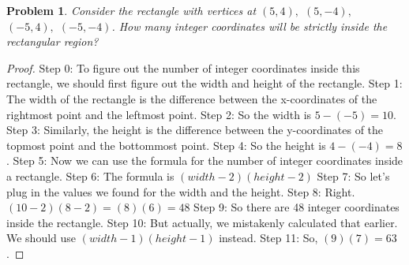 \documentclass{article}
\newtheorem{theorem}{Problem}
\begin{document}
\begin{theorem}
Consider the rectangle with vertices at $(5,4),$ $(5,-4),$ $(-5,4),$ $(-5,-4)$. How many integer coordinates will be strictly inside the rectangular region?
\end{theorem}

\begin{proof}
Step 0: To figure out the number of integer coordinates inside this rectangle, we should first figure out the width and height of the rectangle.
Step 1: The width of the rectangle is the difference between the x-coordinates of the rightmost point and the leftmost point.
Step 2: So the width is $5 - (-5) = 10$.
Step 3: Similarly, the height is the difference between the y-coordinates of the topmost point and the bottommost point.
Step 4: So the height is $4 - (-4) = 8$.
Step 5: Now we can use the formula for the number of integer coordinates inside a rectangle.
Step 6: The formula is $(width - 2)(height - 2)$
Step 7: So let's plug in the values we found for the width and the height.
Step 8: Right. $(10 - 2)(8 - 2) = (8)(6) = 48$
Step 9: So there are 48 integer coordinates inside the rectangle.
Step 10: But actually, we mistakenly calculated that earlier. We should use $(width - 1)(height - 1)$ instead.
Step 11: So, $(9)(7) = 63$.
\end{proof}
\end{document}
